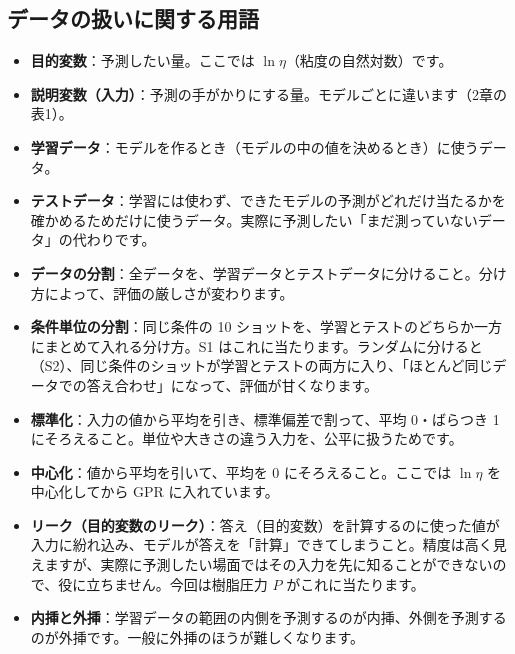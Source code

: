 \documentclass[paper=a4paper,fontsize=10.5pt,line_length=44zw,number_of_lines=38]{jlreq}
\newenvironment{termlist}{\begin{itemize}[label=・,leftmargin=1\zw,labelwidth=1\zw,labelsep=0pt,itemsep=0.4ex,topsep=0.6ex,parsep=0pt]}{\end{itemize}}
\newcommand{\term}[1]{\item \textbf{#1}：}
\begin{document}
\subsection{データの扱いに関する用語}
\begin{termlist}
\term{目的変数}予測したい量。ここでは $\ln\eta$（粘度の自然対数）です。
\term{説明変数（入力）}予測の手がかりにする量。モデルごとに違います（2章の表1）。
\term{学習データ}モデルを作るとき（モデルの中の値を決めるとき）に使うデータ。
\term{テストデータ}学習には使わず、できたモデルの予測がどれだけ当たるかを確かめるためだけに使うデータ。実際に予測したい「まだ測っていないデータ」の代わりです。
\term{データの分割}全データを、学習データとテストデータに分けること。分け方によって、評価の厳しさが変わります。
\term{条件単位の分割}同じ条件の 10 ショットを、学習とテストのどちらか一方にまとめて入れる分け方。S1 はこれに当たります。ランダムに分けると（S2）、同じ条件のショットが学習とテストの両方に入り、「ほとんど同じデータでの答え合わせ」になって、評価が甘くなります。
\term{標準化}入力の値から平均を引き、標準偏差で割って、平均 0・ばらつき 1 にそろえること。単位や大きさの違う入力を、公平に扱うためです。
\term{中心化}値から平均を引いて、平均を 0 にそろえること。ここでは $\ln\eta$ を中心化してから GPR に入れています。
\term{リーク（目的変数のリーク）}答え（目的変数）を計算するのに使った値が入力に紛れ込み、モデルが答えを「計算」できてしまうこと。精度は高く見えますが、実際に予測したい場面ではその入力を先に知ることができないので、役に立ちません。今回は樹脂圧力 $P$ がこれに当たります。
\term{内挿と外挿}学習データの範囲の内側を予測するのが内挿、外側を予測するのが外挿です。一般に外挿のほうが難しくなります。
\end{termlist}
\end{document}
